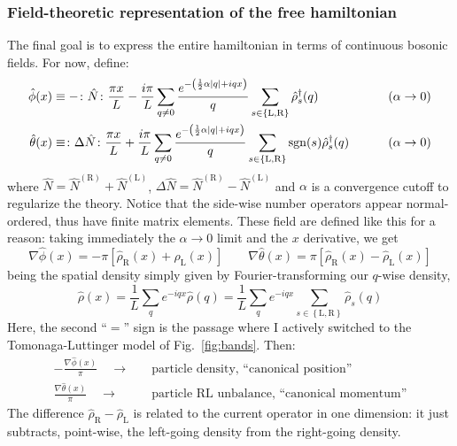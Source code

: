 \subsubsection{Field-theoretic representation of the free hamiltonian}

The final goal is to express the entire hamiltonian in terms of continuous bosonic fields. For now, define:
\[
\begin{aligned}
	\hat \phi(x) &\equiv - \colon \hat N \colon \frac{\pi x}{L} - \frac{i\pi}{L} \sum_{q \neq 0} \frac{e^{-\left( \frac{1}{2} \alpha \abs{q} + iqx \right)}}{q} \sum_{s \in \left\{\mathrm L, \mathrm R\right\}} \hat \rho_s^\dagger (q) &&\qquad\left( \alpha \to 0 \right) \\
	\hat \theta(x) &\equiv \colon \Delta \hat N \colon \frac{\pi x}{L} + \frac{i\pi}{L} \sum_{q \neq 0} \frac{e^{-\left( \frac{1}{2} \alpha \abs{q} + iqx \right)}}{q} \sum_{s \in \left\{\mathrm L, \mathrm R\right\}} \mathrm{sgn}(s) \hat \rho_s^\dagger (q) &&\qquad\left( \alpha \to 0 \right)
\end{aligned}
\]
where $\hat N = \hat N^{(\mathrm R)} + \hat N^{(\mathrm L)}$, $\Delta \hat N = \hat N^{(\mathrm R)} - \hat N^{(\mathrm L)}$ and $\alpha$ is a convergence cutoff to regularize the theory. Notice that the side-wise number operators appear normal-ordered, thus have finite matrix elements.
These field are defined like this for a reason: taking immediately the $\alpha \to 0$ limit and the $x$ derivative, we get
\begin{equation}\label{eq:fields-density-equations}
	\nabla \hat \phi(x) = - \pi \left[ \hat \rho_\mathrm{R}(x) + \hat \rho_\mathrm{L}(x) \right]
	\qquad
	\nabla \hat \theta(x) = \pi \left[ \hat \rho_\mathrm{R}(x) - \hat \rho_\mathrm{L}(x) \right]
\end{equation}
being the spatial density simply given by Fourier-transforming our $q$-wise density,
\[
	\hat \rho(x) = \frac{1}{L} \sum_q e^{-iqx} \hat \rho(q) = \frac{1}{L} \sum_q e^{-iqx} \sum_{s \in \left\{\mathrm L, \mathrm R\right\}} \hat \rho_s(q)
\]
Here, the second ``$=$'' sign is the passage where I actively switched to the Tomonaga-Luttinger model of Fig.~\ref{fig:bands}.
Then:
\[
\begin{aligned}
	- \frac{\nabla \hat \phi(x)}{\pi} \quad\to\quad &\text{particle density, ``canonical position''}\\
	\frac{\nabla \hat \theta(x)}{\pi} \quad\to\quad &\text{particle $\mathrm{RL}$ unbalance, ``canonical momentum''}
\end{aligned}
\]
The difference $\hat \rho_\mathrm{R} - \hat \rho_\mathrm{L}$ is related to the current operator in one dimension: it just subtracts, point-wise, the left-going density from the right-going density.

